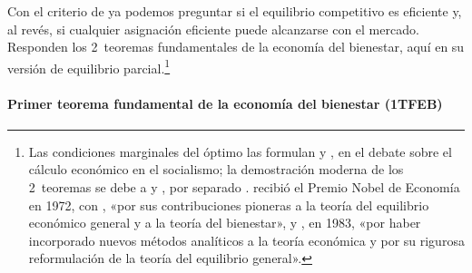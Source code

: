 \documentclass[11pt]{article}
\begin{document}
Con el criterio de  ya podemos preguntar si el equilibrio competitivo es eficiente y, al revés, si cualquier asignación eficiente puede alcanzarse con el mercado. Responden los 2~teoremas fundamentales de la economía del bienestar, aquí en su versión de equilibrio parcial.\footnote{Las condiciones marginales del óptimo las formulan \textcite{Lerner1934Economic} y \textcite{Lange1942Foundations}, en el debate sobre el cálculo económico en el socialismo; la demostración moderna de los 2~teoremas se debe a \textcite{Arrow1951Extension} y \textcite{Debreu1951Coefficient}, por separado .  recibió el Premio Nobel de Economía en 1972, con , «por sus contribuciones pioneras a la teoría del equilibrio económico general y a la teoría del bienestar»\nocite{Nobel1972HicksArrow}, y , en 1983, «por haber incorporado nuevos métodos analíticos a la teoría económica y por su rigurosa reformulación de la teoría del equilibrio general»\nocite{Nobel1983Debreu}.}

\paragraph{Primer teorema fundamental de la economía del bienestar (1TFEB)}
\end{document}
